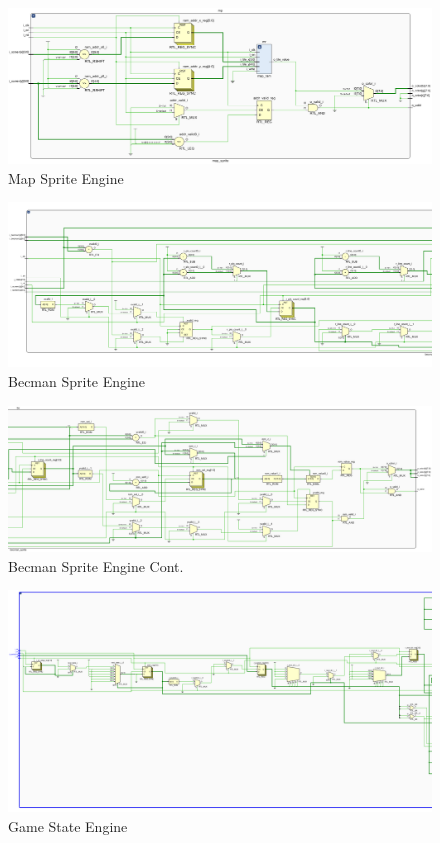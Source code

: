 \documentclass[12pt]{article}
\begin{document}
\begin{figure}
    \includegraphics[width=\textwidth]{MapSprite.png}
    \caption{Map Sprite Engine}
    \label{fig:LandscapeFigure}
\end{figure}

\begin{figure}
    \includegraphics[width=\textwidth]{BecmanSpritePt1.png}
    \caption{Becman Sprite Engine}
    \label{fig:LandscapeFigure}
\end{figure}

\begin{figure}
    \includegraphics[width=\textwidth]{BecmanSpritePt2.png}
    \caption{Becman Sprite Engine Cont.}
    \label{fig:LandscapeFigure}
\end{figure}

\begin{figure}
    \includegraphics[width=\textwidth]{GameStatePt1.png}
    \caption{Game State Engine}
    \label{fig:LandscapeFigure}
\end{figure}
\end{document}
